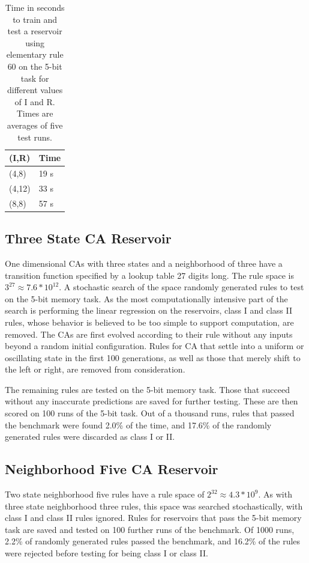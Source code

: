 \documentclass{article}
\begin{document}
\begin{multicols}{2}
\begin{table}[H]
\begin{tabular}{|l|l|}
\hline
(I,R) & Time \\ \hline
(4,8) & 19 s \\ \hline
(4,12) & 33 s \\ \hline
(8,8) & 57 s \\ \hline
\end{tabular}
\caption{Time in seconds to train and test a reservoir using elementary rule 60 
    on the 5-bit task for different values of I and R. Times are averages of 
        five test runs.}
\label{table:time}
\end{table}

  
\subsection{Three State CA Reservoir}
One dimensional CAs with three states and a neighborhood of three have a 
transition function specified by a lookup table 27 digits long. The rule space 
is $3^27 \approx 7.6 * 10^12$. A stochastic search of the space randomly 
generated rules to test on the 5-bit memory task. As the most computationally 
intensive part of the search is performing the linear regression on the 
reservoirs, class I and class II rules, whose behavior is believed to be too 
simple to support computation, are removed. The CAs are first evolved according 
to their rule without any inputs beyond a random initial configuration. Rules 
for CA that settle into a uniform or oscillating state in the first 100 
generations, as well as those that merely shift to the left or right, are 
removed from consideration.\par
The remaining rules are tested on the 5-bit memory task.  Those that succeed 
without any inaccurate predictions are saved for further testing.  These are 
then scored on 100 runs of the 5-bit task.  Out of a thousand runs, rules that 
passed the benchmark were found 2.0\% of the time, and 17.6\% of the randomly 
generated rules were discarded as class I or II.
    
\subsection{Neighborhood Five CA Reservoir}
Two state neighborhood five rules have a rule space of $2^32 \approx 4.3 * 
10^9$. As with three state neighborhood three rules, this space was searched 
stochastically, with class I and class II rules ignored. Rules for reservoirs 
that pass the 5-bit memory task are saved and tested on 100 further runs of the 
benchmark. Of 1000 runs, 2.2\% of randomly generated rules passed the 
benchmark, and 16.2\% of the rules were rejected before testing for being class 
I or class II.

\end{multicols}
\end{document}
